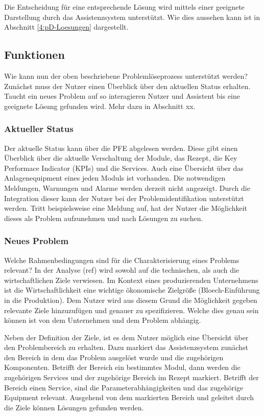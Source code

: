 Die Entscheidung für eine entsprechende Lösung wird mittels einer geeignete Darstellung durch das Assistenzsystem unterstützt. Wie dies aussehen kann ist in Abschnitt \ref{4:pD-Loesungen} dargestellt.

\subsection{Funktionen}
Wie kann nun der oben beschriebene Problemlöseprozess unterstützt werden? Zunächst muss der Nutzer einen Überblick über den aktuellen Status erhalten. Taucht ein neues Problem auf so interagieren Nutzer und Assistent bis eine geeignete Lösung gefunden wird. Mehr dazu in Abschnitt xx.

\subsubsection*{Aktueller Status}
Der aktuelle Status kann über die PFE abgelesen werden. Diese gibt einen Überblick über die aktuelle Verschaltung der Module, das Rezept, die Key Performace Indicator (KPIs) und die Services. Auch eine Übersicht über das Anlagenequipment eines jeden Moduls ist vorhanden. Die notwendigen Meldungen, Warnungen und Alarme werden derzeit nicht angezeigt. Durch die Integration dieser kann der Nutzer bei der Problemidentifikation unterstützt werden. Tritt beispielsweise eine Meldung auf, hat der Nutzer die Möglichkeit dieses als Problem aufzunehmen und nach Lösungen zu suchen.

\subsubsection*{Neues Problem}
Welche Rahmenbedingungen sind für die Charakterisierung eines Problems relevant? In der Analyse (ref) wird sowohl auf die technischen, als auch die wirtschaftlichen Ziele verwiesen. Im Kontext eines produzierenden Unternehmens ist die Wirtschaftlichkeit eine wichtige ökonomische Zielgröße \cite{} (Bloech-Einführung in die Produktion). Dem Nutzer wird aus diesem Grund die Möglichkeit gegeben relevante Ziele hinzuzufügen und genauer zu spezifizieren. Welche dies genau sein können ist von dem Unternehmen und dem Problem abhängig.

Neben der Definition der Ziele, ist es dem Nutzer möglich eine Übersicht über den Problembereich zu erhalten. Dazu markiert das Assistenzsystem zunächst den Bereich in dem das Problem ausgelöst wurde und die zugehörigen Komponenten. Betrifft der Bereich ein bestimmtes Modul, dann werden die zugehörigen Services und der zugehörige Bereich im Rezept markiert. Betrifft der Bereich einen Service, sind die Parameterabhängigkeiten und das zugehörige Equipment relevant. Ausgehend von dem markierten Bereich und geleitet durch die Ziele können Lösungen gefunden werden.

